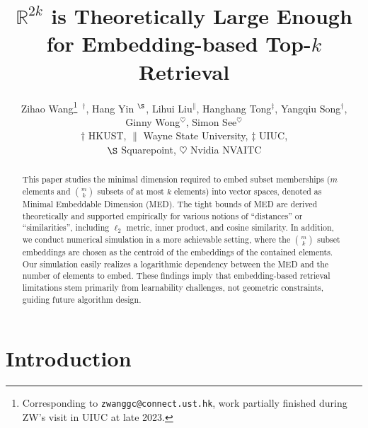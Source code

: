 \documentclass[10pt]{article}
\begin{document}
\title{$\mathbb{R}^{2k}$ is Theoretically Large Enough for Embedding-based Top-$k$ Retrieval}
\author{Zihao Wang\thanks{Corresponding to \texttt{zwanggc@connect.ust.hk}, work partially finished during ZW's visit in UIUC at late 2023.}$\,\,\,^\dag$, Hang Yin $^\S$, Lihui Liu$^\|$, Hanghang Tong$^\ddag$, Yangqiu Song$^\dag$,\\ Ginny Wong$^\heartsuit$, Simon See$^\heartsuit$\\
$\dag$ HKUST, $\|$ Wayne State University, $\ddag$ UIUC, \\$\S$ Squarepoint,  $\heartsuit$ Nvidia NVAITC
}
\maketitle
\begin{abstract}
This paper studies the minimal dimension required to embed subset memberships ($m$ elements and ${m\choose k}$ subsets of at most $k$ elements) into vector spaces, denoted as Minimal Embeddable Dimension (MED).
The tight bounds of MED are derived theoretically and supported empirically for various notions of ``distances'' or ``similarities'', including $\ell_2$ metric, inner product, and cosine similarity.
In addition, we conduct numerical simulation in a more achievable setting, where the ${m\choose k}$ subset embeddings are chosen as the centroid of the embeddings of the contained elements. Our simulation easily realizes a logarithmic dependency between the MED and the number of elements to embed.
These findings imply that embedding-based retrieval limitations stem primarily from learnability challenges, not geometric constraints, guiding future algorithm design.
\end{abstract}
\section{Introduction}
\end{document}
